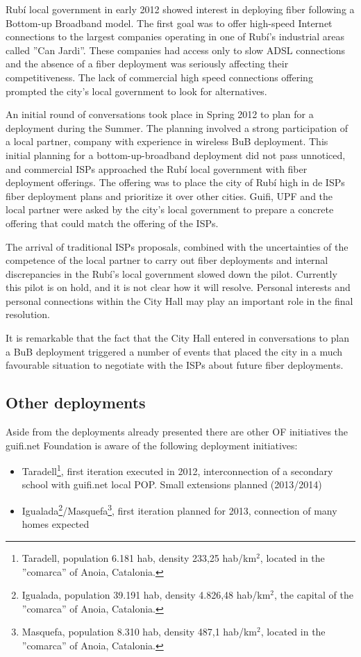 Rub\'{i} local government in early 2012 showed interest in deploying fiber following a Bottom-up Broadband model.
The first goal was to offer high-speed Internet connections to the largest companies operating in one of Rub\'{i}'s industrial areas called ''Can Jardi''.
These companies had access only to slow ADSL connections and the absence of a fiber deployment was seriously affecting their competitiveness.
The lack of commercial high speed connections offering prompted the city's local government to look for alternatives.

An initial round of conversations took place in Spring 2012 to plan for a deployment during the Summer.
The planning involved a strong participation of a local partner, company with experience in wireless BuB deployment.
This initial planning for a bottom-up-broadband deployment did not pass unnoticed, and commercial ISPs approached the Rub\'{i} local government with fiber deployment offerings.
The offering was to place the city of Rub\'{i} high in de ISPs fiber deployment plans and prioritize it over other cities.
Guifi, UPF and the local partner were asked by the city's local government to prepare a concrete offering that could match the offering of the ISPs.

The arrival of traditional ISPs proposals, combined with the uncertainties of the competence of the local partner to carry out fiber deployments and internal discrepancies in the Rub\'{i}'s local government slowed down the pilot.
Currently this pilot is on hold, and it is not clear how it will resolve.
Personal interests and personal connections within the City Hall may play an important role in the final resolution.

It is remarkable that the fact that the City Hall entered in conversations to plan a BuB deployment triggered a number of events that placed the city in a much favourable situation to negotiate with the ISPs about future fiber deployments.


\FloatBarrier
\subsection{Other deployments}

Aside from the deployments already presented there are other OF initiatives the guifi.net Foundation is aware of the following deployment initiatives:

\begin{itemize}
  \item Taradell\footnote{Taradell, population 6.181 hab, density 233,25 hab/km$^{2}$, located in the ''comarca'' of Anoia, Catalonia.}, first iteration executed in 2012, interconnection of a secondary school with guifi.net local POP. Small extensions planned (2013/2014)
  \item Igualada\footnote{Igualada, population 39.191 hab, density 4.826,48 hab/km$^{2}$, the capital of the ''comarca'' of Anoia, Catalonia.}/Masquefa\footnote{Masquefa, population 8.310 hab, density 487,1 hab/km$^{2}$, located in the ''comarca'' of Anoia, Catalonia.}, first iteration planned for 2013, connection of many homes expected
\end{itemize}

